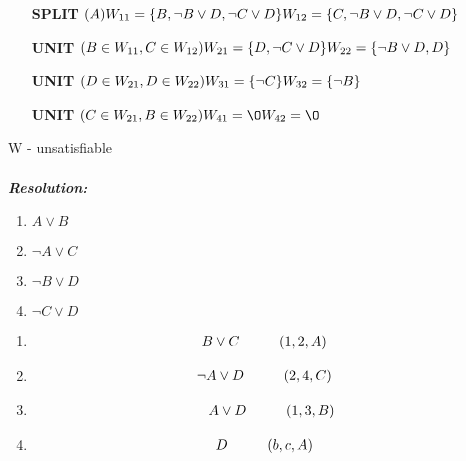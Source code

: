 \documentclass[a4paper,12pt]{article}
\newcommand\tab[1][1cm]{\hspace*{#1}}
\begin{document}
\begin{enumerate}
	\begin{itemize}
		\item [\textbf{SPLIT}] $(A)\\W_{11}=\{B,\neg B\lor D,\neg C\lor D\}\\W_{12}=\{C,\neg B\lor D,\neg C\lor D\}$
		\item [\textbf{UNIT}] $(B\in W_{11},C\in W_{12})\\W_{21}=\{D,\neg C\lor D\}\\W_{22}=\{\neg B\lor D,D\}$
		\item [\textbf{UNIT}] $(D\in W_{21},D\in W_{22})\\W_{31}=\{\neg C\}\\W_{32}=\{\neg B\}$
		\item [\textbf{UNIT}] $(C\in W_{21},B\in W_{22})\\W_{41}=\O\\W_{42}=\O$
	\end{itemize}
	W - unsatisfiable
	\\\\\emph{\textbf{Resolution:}}\\
	\begin{multicols}{4}
		\begin{enumerate}[(1)]
			\item $A\lor B$
			\item $\neg A\lor C$
			\item $\neg B\lor D$
			\item $\neg C\lor D$
		\end{enumerate}
	\end{multicols}
	\begin{multicols}{2}
		\begin{enumerate}
			\item \begin{align*}
				B\lor C\tab &(1,2,A)
			\end{align*}
			\item \begin{align*}
				\neg A\lor D\tab & (2,4,C) 
			\end{align*}
			\item \begin{align*}
				A\lor D\tab (1,3,B)
			\end{align*}
			\item \begin{align*}
				D\tab & (b,c,A)
			\end{align*}
		\end{enumerate}
	\end{multicols}

\end{enumerate}
\end{document}
